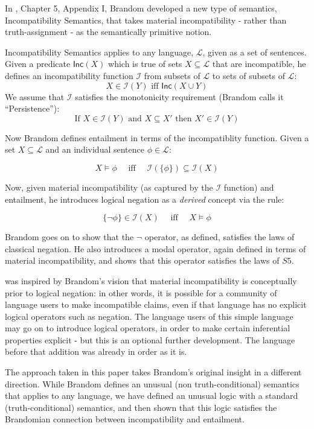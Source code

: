 \NI In \cite{brandom}, Chapter 5, Appendix I, Brandom developed a new
type of semantics, Incompatibility Semantics, that takes material
incompatibility - rather than truth-assignment - as the semantically
primitive notion.

Incompatibility Semantics applies to any language, $\mathcal{L}$,
given as a set of sentences.  Given a predicate $\mathsf{Inc}(X)$ which is true of sets $X \subseteq \mathcal{L}$ that are incompatible, he defines an incompatibility function
$\mathcal{I}$ from subsets of $\mathcal{L}$ to sets of subsets of $\mathcal{L}$:
\[
X \in \mathcal{I}(Y) \text{ iff } \mathsf{Inc}(X \cup Y)
\]
We assume that $\mathcal{I}$ satisfies the
monotonicity requirement (Brandom calls it ``Persistence''):
\[
   \text{If } X \in \mathcal{I}(Y) \text{ and } X \subseteq X' \text{ then } X' \in \mathcal{I}(Y)
\]

\NI Now Brandom defines entailment in terms of the incompatiblity
function. Given a set $X \subseteq \mathcal{L}$ and an individual
sentence $\phi \in \mathcal{L}$:

\[
   X \models \phi\quad \text{ iff }\quad \mathcal{I}(\{\phi\}) \subseteq \mathcal{I}(X)
\]

\NI Now, given material incompatibility (as captured by the
$\mathcal{I}$ function) and entailment, he introduces logical negation
as a \emph{derived} concept via the rule:

\[
   \{\neg \phi\} \in \mathcal{I}(X)\quad \text{ iff }\quad X \models \phi
\]

\NI Brandom goes on to show that the $\neg$ operator, as defined, satisfies
the laws of classical negation.  He also introduces a modal operator,
again defined in terms of material incompatibility, and shows that
this operator satisfies the laws of $S5$.

\Cathoristic{} was inspired by Brandom's vision that material
incompatibility is conceptually prior to logical negation: in other
words, it is possible for a community of language users to make incompatible claims, even if that
language has no explicit logical operators such as negation.  The
language users of this simple language may go on to introduce logical
operators, in order to make certain inferential properties explicit -
but this is an optional further development.  The language before that
addition was already in order as it is.

The approach taken in this paper takes Brandom's original insight in a
different direction.  While Brandom defines an unusual (non
truth-conditional) semantics that applies to any language, we have
defined an unusual logic with a standard (truth-conditional) semantics, and then shown that this logic satisfies the Brandomian connection between incompatibility and entailment.

